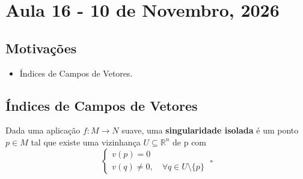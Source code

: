 \documentclass[../differential_topology.tex]{subfiles}
\begin{document}
\section{Aula 16 - 10 de Novembro, 2026}
\subsection{Motivações}
\begin{itemize}
	\item Índices de Campos de Vetores.
\end{itemize}
\subsection{Índices de Campos de Vetores}
\begin{def*}
	Dada uma aplicação \(f:M\rightarrow N\) suave, uma \textbf{singularidade isolada} é um ponto \(p\in M\) tal que existe uma vizinhança \(U\subseteq \mathbb{R}^{n}\) de p com
	\[
		\left\{\begin{array}{ll}
			v(p) = 0 \\
			v(q)\neq 0, \quad \forall q \in U\setminus{\{p\}}
		\end{array}\right.\; \square
	\]
\end{def*}
\end{document}
